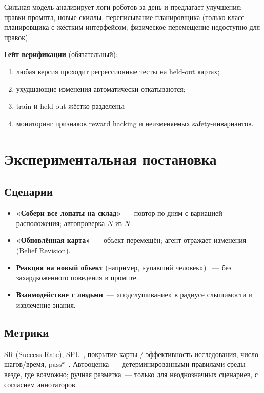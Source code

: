 \documentclass[11pt,a4paper]{article}
\begin{document}
Сильная модель анализирует логи роботов за день и предлагает улучшения:
правки промпта, новые скиллы, переписывание планировщика
(только класс планировщика с жёстким интерфейсом; физическое перемещение
недоступно для правок).

\textbf{Гейт верификации} (обязательный):
\begin{enumerate}[leftmargin=*]
  \item любая версия проходит регрессионные тесты на held-out картах;
  \item ухудшающие изменения автоматически откатываются;
  \item train и held-out жёстко разделены;
  \item мониторинг признаков reward hacking и неизменяемых safety-инвариантов.
\end{enumerate}

\section{Экспериментальная постановка}
\label{sec:setup}

\subsection{Сценарии}

\begin{itemize}[leftmargin=*]
  \item \textbf{«Собери все лопаты на склад»}~--- повтор по дням с вариацией
        расположения; автопроверка \(N\) из \(N\).
  \item \textbf{«Обновлённая карта»}~--- объект перемещён; агент отражает
        изменения (Belief Revision).
  \item \textbf{Реакция на новый объект} (например, «упавший человек»)~
        --- без захардкоженного поведения в промпте.
  \item \textbf{Взаимодействие с людьми}~--- «подслушивание» в радиусе
        слышимости и извлечение знания.
\end{itemize}

\subsection{Метрики}

SR (Success Rate), SPL~\cite{anderson2018spl}, покрытие карты / эффективность
исследования, число шагов/время, \(\mathrm{pass}^k\)~\cite{taubench2024}.
Автооценка~--- детерминированными правилами среды везде, где возможно;
ручная разметка~--- только для неоднозначных сценариев, с согласием аннотаторов.
\end{document}
